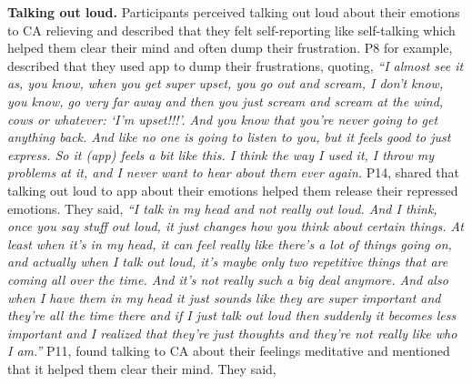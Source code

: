             

            
         
        \textbf{Talking out loud. }
            Participants perceived talking out loud about their emotions to \ac{CA} relieving and 
            described that they felt self-reporting like self-talking which helped them clear their mind and often dump their frustration.
            P8 for example, described that they used \acl{app} to dump their frustrations, quoting, 
                \textit{
                ``I almost see it as, you know, when you get super upset, you go out and scream, I don't know, 
                you know, go very far away and then you just scream and scream at the wind, cows or whatever: `I'm upset!!!'. 
                And you know that you're never going to get anything back. And like no one is going to listen to you, but it feels good to just express. So it (\acl{app}) feels a bit like this.
                I think the way I used it, I throw my problems at it, and I never want to hear about them ever again. 
                }
            P14, shared that talking out loud to \acl{app} about their emotions helped them release their repressed emotions. They said,
                \textit{
                ``I talk in my head and not really out loud. And I think, once you say stuff out loud, it just changes how you think about certain things. At least when it's in my head, it can feel really like there's a lot of things going on, and actually when I talk out loud, it's maybe only two repetitive things that are coming all over the time. And it's not really such a big deal anymore. And also when I have them in my head it just sounds like they are super important and they're all the time there and if I just talk out loud then suddenly it becomes less important and I realized that they're just thoughts and they're not really like who I am.''
                }
            P11, found talking to \ac{CA} about their feelings meditative and mentioned that it helped them clear their mind.
            They said,
